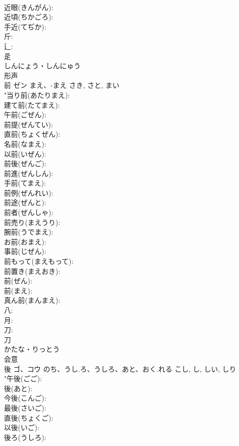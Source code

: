 \documentclass[8pt]{extreport}
\begin{document}
\begin{CJK}{UTF8}{min}
\\	近眼(きんがん): 
\\	近頃(ちかごろ): 
\\	手近(てぢか): 
\\	斤: 
\\	辶: 
\\	辵	
\\	しんにょう・しんにゅう	
\\	形声 
\\	前	ゼン	まえ、-まえ	さき, さと, まい	
\\	"当り前(あたりまえ): 
\\	建て前(たてまえ): 
\\	午前(ごぜん): 
\\	前提(ぜんてい): 
\\	直前(ちょくぜん): 
\\	名前(なまえ): 
\\	以前(いぜん): 
\\	前後(ぜんご): 
\\	前進(ぜんしん): 
\\	手前(てまえ): 
\\	前例(ぜんれい): 
\\	前途(ぜんと): 
\\	前者(ぜんしゃ): 
\\	前売り(まえうり): 
\\	腕前(うでまえ): 
\\	お前(おまえ): 
\\	事前(じぜん): 
\\	前もって(まえもって): 
\\	前置き(まえおき): 
\\	前(ぜん): 
\\	前(まえ): 
\\	真ん前(まんまえ): 
\\	八: 
\\	月: 
\\	刀: 
\\	刀	
\\	かたな・りっとう	
\\	会意 
\\	後	ゴ、コウ	のち、うし.ろ、うしろ、あと、おく.れる	こし, し, しい, しり	
\\	"午後(ごご): 
\\	後(あと): 
\\	今後(こんご): 
\\	最後(さいご): 
\\	直後(ちょくご): 
\\	以後(いご): 
\\	後ろ(うしろ): 

\end{CJK}
\end{document}
